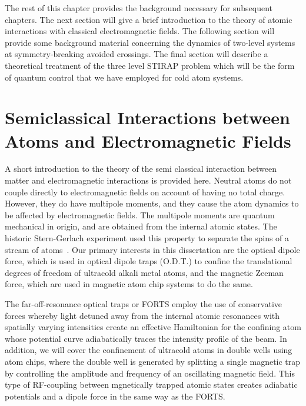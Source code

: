 The rest of this chapter provides the background necessary for subsequent chapters. The next section will give a brief introduction to the theory of atomic interactions with classical electromagnetic fields. The following section will provide some background material concerning the dynamics of two-level systems at symmetry-breaking avoided crossings. The final section will describe a theoretical treatment of the three level STIRAP problem which will be the form of quantum control that we have employed for cold atom systems.

\section{Semiclassical Interactions between Atoms and Electromagnetic Fields}
\label{chapter-intro:section:lightatom}
A short introduction to the theory of the semi classical interaction between matter and electromagnetic interactions is provided here. Neutral atoms do not couple directly to electromagnetic fields on account of having no total charge. However, they do have multipole moments, and they cause the atom dynamics to be affected by electromagnetic fields. The multipole moments are quantum mechanical in origin, and are obtained from the internal atomic states. The historic Stern-Gerlach experiment used this property to separate the spins of a stream of atoms~\cite{sakurai}. Our primary interests in this dissertation are the optical dipole force, which is used in optical dipole traps (O.D.T.) to confine the translational degrees of freedom of ultracold alkali metal atoms, and the magnetic Zeeman force, which are used in magnetic atom chip systems to do the same. 

The far-off-resonance optical traps or FORTS employ the use of conservative forces whereby light detuned away from the internal atomic resonances with spatially varying intensities create an effective Hamiltonian for the confining atom whose potential curve adiabatically traces the intensity profile of the beam.  In addition, we will cover the confinement of ultracold atoms in double wells using atom chips, where the double well is generated by splitting a single magnetic trap by controlling the amplitude and frequency of an oscillating magnetic field. This type of RF-coupling between mgnetically trapped atomic states creates adiabatic potentials and a dipole force in the same way as the FORTS.

